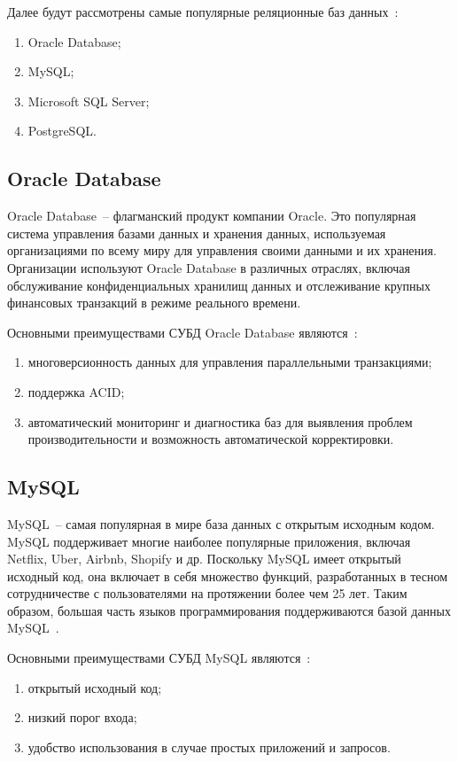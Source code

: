 Далее будут рассмотрены самые популярные реляционные баз данных~\cite{popularDB}:
\begin{enumerate}
	\item Oracle Database;
	\item MySQL;
	\item Microsoft SQL Server;
	\item PostgreSQL.
\end{enumerate}

\subsection{Oracle Database}

Oracle Database~-- флагманский продукт компании Oracle.
Это популярная система управления базами данных и хранения данных, используемая организациями по всему миру для управления своими данными и их хранения.
Организации используют Oracle Database в различных отраслях, включая обслуживание конфиденциальных хранилищ данных и отслеживание крупных финансовых транзакций в режиме реального времени.

Основными преимуществами СУБД Oracle Database являются~\cite{cmpSCDB5}:
\begin{enumerate}
	\item многоверсионность данных для управления параллельными транзакциями;
	\item поддержка ACID;
	\item автоматический мониторинг и диагностика баз для выявления проблем производительности и возможность автоматической корректировки.
\end{enumerate}

\subsection{MySQL}

MySQL~-- самая популярная в мире база данных с открытым исходным кодом.
MySQL поддерживает многие наиболее популярные приложения, включая Netflix, Uber, Airbnb, Shopify и др.
Поскольку MySQL имеет открытый исходный код, она включает в себя множество функций, разработанных в тесном сотрудничестве с пользователями на протяжении более чем 25 лет.
Таким образом, большая часть языков программирования поддерживаются базой данных MySQL~\cite{mysql}.

Основными преимуществами СУБД MySQL являются~\cite{cmpSCDB1, cmpSCDB2, cmpSCDB3}:
\begin{enumerate}
	\item открытый исходный код;
	\item низкий порог входа;
	\item удобство использования в случае простых приложений и запросов.
\end{enumerate}


